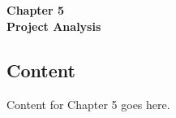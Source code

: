 
\titleformat{\chapter}[block]{\normalfont}{}{0pt}{}
\titlespacing{\chapter}{0pt}{-2em}{0pt}
\chapter[Project Analysis]{}
\vspace*{\fill}
\begin{center}
\textbf{\Huge{Chapter 5}}\\
\vspace{5mm}
\textbf{\Huge{Project Analysis}}
\end{center}
\vspace*{\fill}
\newpage

\titleformat{\chapter}[display]{\vspace{1cm}\normalfont\Large\bfseries\centering}{\chaptertitlename\ \thechapter}{20pt}{\vspace{0pt}}
\titlespacing*{\chapter}{0pt}{-50pt}{20pt}

\section{Content}
\justify

Content for Chapter 5 goes here.

